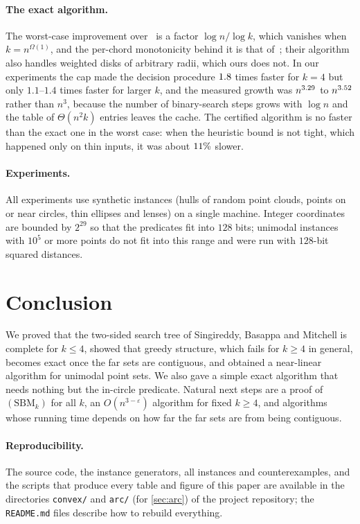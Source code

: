 \documentclass[11pt,a4paper]{article}
\theoremstyle{definition}
\theoremstyle{remark}
\newcommand{\code}[1]{\nolinkurl{#1}}
\begin{document}
\paragraph{The exact algorithm.}
The worst-case improvement over~\cite{tw26} is a factor $\log n/\log k$, which
vanishes when $k=n^{\Omega(1)}$, and the per-chord monotonicity behind it is
that of~\cite{tw26}; their algorithm also handles weighted disks of arbitrary
radii, which ours does not. In our experiments the cap made the decision
procedure $1.8$ times faster for $k=4$ but only $1.1$--$1.4$ times
faster for larger $k$, and the measured growth was $n^{3.29}$ to
$n^{3.52}$ rather than $n^3$, because the number of binary-search
steps grows with $\log n$ and the table of $\Theta(n^2k)$ entries leaves the
cache. The certified algorithm is no faster than the exact one in the worst
case: when the heuristic bound is not tight, which happened only on thin
inputs, it was about $11\%$ slower.

\paragraph{Experiments.}
All experiments use synthetic instances (hulls of random point clouds, points
on or near circles, thin ellipses and lenses) on a single machine. Integer
coordinates are bounded by $2^{29}$ so that the predicates fit into $128$ bits;
unimodal instances with $10^5$ or more points do not fit into this range and
were run with $128$-bit squared distances.

\section{Conclusion}\label{sec:conclusion}

We proved that the two-sided search tree of Singireddy, Basappa and
Mitchell is complete for $k\le4$, showed that greedy structure, which fails
for $k\ge4$ in general, becomes exact once the far sets are contiguous, and
obtained a near-linear algorithm for unimodal point sets. We also gave a simple
exact algorithm that needs nothing but the in-circle predicate. Natural next
steps are a proof of $(\mathrm{SBM}_k)$ for all $k$, an
$O(n^{3-\varepsilon})$ algorithm for fixed $k\ge4$, and algorithms whose running
time depends on how far the far sets are from being contiguous.

\paragraph{Reproducibility.}
The source code, the instance generators, all instances and counterexamples,
and the scripts that produce every table and figure of this paper are
available in the directories \code{convex/} and \code{arc/} (for
\cref{sec:arc}) of the project repository; the \code{README.md} files
describe how to rebuild everything.
\end{document}
